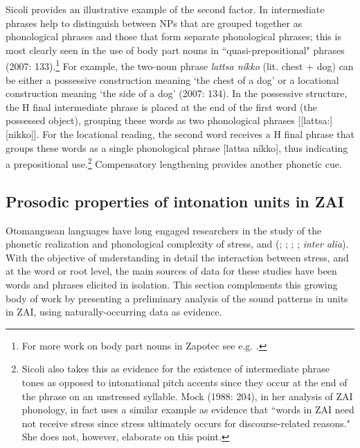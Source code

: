 Sicoli provides an illustrative example of the second factor. In   intermediate phrases help to distinguish between NPs that are grouped together as phonological phrases and those that form separate phonological phrases; this is most clearly seen in the use of body part nouns in ``quasi-prepositional" phrases (2007: 133).\footnote{For more work on body part nouns in Zapotec see e.g. \citet{maclaury1989,lillehaugen2006}.} For example, the two-noun phrase \textit{lattsa n\'{i}kko} (lit. chest + dog) can be either a possessive construction meaning `the chest of a dog' or a locational construction meaning `the side of a dog' (2007: 134). In the possessive structure, the H final intermediate phrase  is placed at the end of the first word (the possessed object), grouping these words as two phonological phrases [[lattsa:][nikko]]. For the locational reading, the second word receives a H final phrase  that groups these words as a single phonological phrase [lattsa n\'{i}kko], thus indicating a prepositional use.\footnote{Sicoli also takes this as evidence for the existence of intermediate phrase tones as opposed to intonational pitch accents since they occur at the end of the phrase on an unstressed syllable. Mock (1988: 204), in her analysis of ZAI phonology, in fact uses a similar example as evidence that ``words in ZAI need not receive stress since stress ultimately occurs for discourse-related reasons." She does not, however, elaborate on this point.} Compensatory lengthening provides another phonetic cue. 


\subsection{Prosodic properties of intonation units in ZAI}\label{stressrule}

Otomanguean languages have long engaged researchers in the study of the phonetic realization and phonological complexity of stress,  and  (\citealt{arellanes2009}; \citealt{avelino2004}; \citealt{chavezpeon2010}; \citealt{mock1988}; \textit{inter alia}). With the objective of understanding in detail the interaction between stress,  and  at the word or root level, the main sources of data for these studies have been words and phrases elicited in isolation. This section complements this growing body of work by presenting a preliminary analysis of the sound patterns in  units in ZAI, using naturally-occurring data as evidence.

